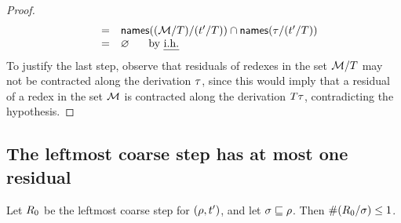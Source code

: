 \begin{proof}
\[\begin{array}{rcll}
  & = & \mathsf{names}((\mathcal{M}/T)/(t'/T)) \cap \mathsf{names}(\tau/(t'/T)) \\
  & = & \varnothing \hspace{.5cm}\text{ by {\em i.h.}} \\
  \end{array}
\]
To justify the last step, observe that residuals of redexes in the set $\mathcal{M}/T$
may not be contracted along the derivation $\tau$,
since this would imply that a residual of a redex in the set $\mathcal{M}$
is contracted along the derivation $T\tau$,
contradicting the hypothesis.
\end{proof}

\subsection*{The leftmost coarse step has at most one residual}
\begin{lemma}
Let $R_0$ be the leftmost coarse step for $(\rho,t')$,
and let $\sigma \sqsubseteq \rho$.
Then $\#(R_0/\sigma) \leq 1$.
\end{lemma}
